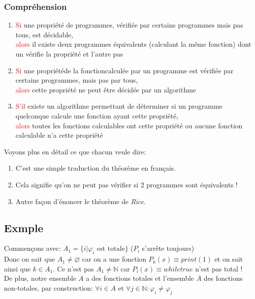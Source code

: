 \documentclass{report}
\begin{document}
\subsubsection{Compréhension}
\begin{enumerate}
\item \textcolor{red}{Si} une propriété de programmes, vérifiée par certains programmes mais pas tous, est décidable, \\
\textcolor{red}{alors} il existe deux programmes équivalents (calculant la même fonction) dont un vérifie la propriété et l’autre pas
\item \textcolor{red}{Si} une propriétéde la fonctioncalculée par un programme est vérifiée par certains programmes, mais pas par tous, \\
\textcolor{red}{alors} cette propriété ne peut être décidée par un algorithme
\item \textcolor{red}{S'il} existe un algorithme permettant de déterminer si un programme quelconque calcule une fonction ayant cette propriété, \\
\textcolor{red}{alors} toutes les fonctions calculables ont cette propriété ou aucune fonction
calculable n’a cette propriété
\end{enumerate}
Voyons plus en détail ce que chacun veule dire:
\begin{enumerate}
\item C'est une simple traduction du théorème en français.
\item Cela signifie qu'on ne peut pas vérifier si 2 programmes sont équivalents !
\item Autre façon d'énoncer le théorème de \textit{Rice}.
\end{enumerate}

\subsection{Exmple}
Commençons avec: $ A_1 = \{i | \varphi_i \text{ est totale}\}$ ($P_i$ s'arrête toujours)\\
Donc on sait que $A_1 \neq \varnothing$ car on a une fonction $P_k(x) \equiv print(1)$ et on sait ainsi que $k \in A_1$. Ce n'est pas $A_1 \neq \mathbb{N}$ car $P_l(x) \equiv while true$ n'est pas total ! De plus, notre ensemble $A$ a des fonctions totales et l'ensemble $\overline{A}$ des fonctions non-totales, par construction: $\forall i \in A \text{ et } \forall j \in \mathbb{N}: \varphi_i \neq \varphi_j$\\
\end{document}
